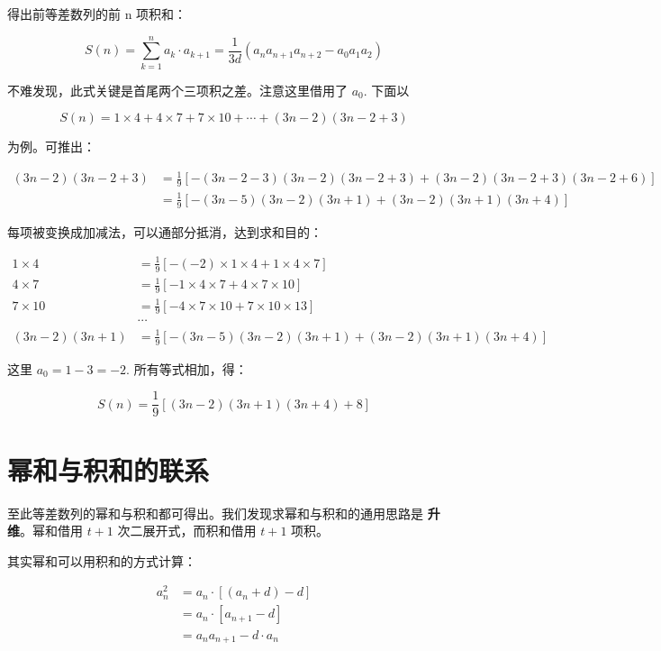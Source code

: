 得出前等差数列的前 n 项积和：

\[
  S(n) = \sum_{k = 1}^n a_k \cdot a_{k+1} = \frac{1}{3d}(a_na_{n+1}a_{n+2} - a_0a_1a_2)
\]

不难发现，此式关键是首尾两个三项积之差。注意这里借用了 $a_0$. 下面以

\[
  S(n) = 1 \times 4 + 4 \times 7 + 7 \times 10 + \cdots + (3n -
  2)(3n - 2 + 3)
\]

为例。可推出：

\[
  \begin{aligned}
    (3n - 2)(3n - 2 + 3)
    &= \frac{1}{9}[-(3n - 2 - 3)(3n - 2)(3n -
    2 + 3) + (3n - 2)(3n - 2 + 3)(3n - 2 + 6)] \\
    &= \frac{1}{9}[-(3n - 5)(3n - 2)(3n + 1) + (3n - 2)(3n + 1)(3n + 4)]
  \end{aligned}
\]

每项被变换成加减法，可以通部分抵消，达到求和目的：

\[
  \begin{aligned}
    1 \times 4 &= \frac{1}{9}[-(-2) \times 1 \times 4 + 1 \times 4
    \times 7] \\
    4 \times 7 &= \frac{1}{9}[-1 \times 4 \times 7 + 4 \times 7
    \times 10] \\
    7 \times 10 &= \frac{1}{9}[-4 \times 7 \times 10 + 7 \times 10
    \times 13] \\
    & \cdots \\
    (3n - 2)(3n + 1) & = \frac{1}{9}[-(3n - 5)(3n - 2)(3n + 1) + (3n - 2)(3n + 1)(3n + 4)]
  \end{aligned}
\]

这里 $a_0 = 1 - 3 = -2$. 所有等式相加，得：

\[
  S(n) = \frac{1}{9}[(3n - 2)(3n + 1)(3n + 4) + 8]
\]

\section{幂和与积和的联系}

至此等差数列的幂和与积和都可得出。我们发现求幂和与积和的通用思路是
\textbf{升维}。幂和借用 $t + 1$ 次二展开式，而积和借用 $t + 1$ 项积。

其实幂和可以用积和的方式计算：

\[
  \begin{aligned}
    a_n^2 &= a_n \cdot [(a_n + d) - d] \\
    &= a_n \cdot [a_{n+1} - d] \\
    &= a_n a_{n+1} - d \cdot a_n \\
  \end{aligned}
\]

